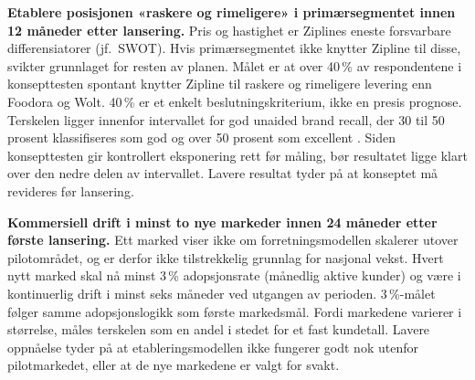 \textbf{Etablere posisjonen «raskere og rimeligere» i primærsegmentet
innen 12 måneder etter lansering.}
Pris og hastighet er Ziplines eneste forsvarbare differensiatorer (jf.\
SWOT). Hvis primærsegmentet ikke knytter Zipline til disse, svikter
grunnlaget for resten av planen. Målet er at over 40\,\% av respondentene i
konsepttesten spontant knytter Zipline til raskere og rimeligere levering
enn Foodora og Wolt. 40\,\% er et enkelt beslutningskriterium, ikke en
presis prognose. Terskelen ligger innenfor intervallet for god unaided brand
recall, der 30 til 50 prosent klassifiseres som god og over 50 prosent som
excellent \parencite{taglab_brandrecall}. Siden konsepttesten gir
kontrollert eksponering rett før måling, bør resultatet ligge klart over den
nedre delen av intervallet. Lavere resultat tyder på at konseptet må
revideres før lansering.

\textbf{Kommersiell drift i minst to nye markeder innen 24 måneder etter
første lansering.}
Ett marked viser ikke om forretningsmodellen skalerer utover
pilotområdet, og er derfor ikke tilstrekkelig grunnlag for nasjonal
vekst. Hvert nytt marked skal nå minst 3\,\% adopsjonsrate (månedlig
aktive kunder) og være i kontinuerlig drift i minst seks måneder ved
utgangen av perioden. 3\,\%-målet følger samme adopsjonslogikk som første
markedsmål. Fordi markedene varierer i størrelse, måles terskelen som en
andel i stedet for et fast kundetall. Lavere oppnåelse tyder på at
etableringsmodellen ikke fungerer godt nok utenfor pilotmarkedet, eller at
de nye markedene er valgt for svakt.
